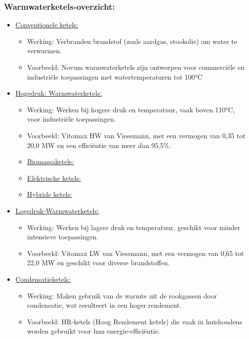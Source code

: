 \documentclass[12pt]{article}
\begin{document}
\subsubsection{Warmwaterketels-overzicht:}
\begin{itemize}
    \item \underline{Conventionele ketels:}\begin{itemize}
        \item Werking: Verbranden brandstof (zoals aardgas, stookolie) om water te verwarmen.
        \item Voorbeeld: Novum warmwaterketels zijn ontworpen voor commerciële en industriële toepassingen met watertemperaturen tot 100°C
    \end{itemize}
    \item \underline{Hogedruk: Warmwaterketels:}\begin{itemize}
        \item Werking: Werken bij hogere druk en temperatuur, vaak boven 110°C, voor
        industriële toepassingen.
        \item Voorbeeld: Vitomax HW van Viessmann, met een vermogen van 0,35 tot 20,0 MW
        en een efficiëntie van meer dan 95,5\%.
        \item \underline{Biomassaketels:}
        \item \underline{Elektrische ketels:}
        \item \underline{Hybride ketels:}
    \end{itemize}
    \item \underline{Lagedruk-Warmwaterketels:}\begin{itemize}
        \item Werking: Werken bij lagere druk en temperatuur, geschikt voor minder intensieve
        toepassingen.
        \item Voorbeeld: Vitomax LW van Viessmann, met een vermogen van 0,65 tot 22,0 MW
        en geschikt voor diverse brandstoffen.
    \end{itemize}
    \item \underline{Condensatieketels:}\begin{itemize}
        \item Werking: Maken gebruik van de warmte uit de rookgassen door condensatie, wat
        resulteert in een hoger rendement.
        \item Voorbeeld: HR-ketels (Hoog Rendement ketels) die vaak in huishoudens worden
        gebruikt voor hun energie-efficiëntie.
    \end{itemize}
\end{itemize}
\end{document}
